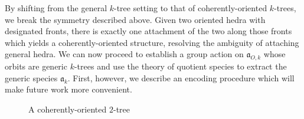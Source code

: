 \documentclass[sectionflow,singlespace,twoside]{brandiss} %
\numberwithin{section}{chapter}
\numberwithin{figure}{chapter}
\begin{document}
By shifting from the general $k$-tree setting to that of coherently-oriented $k$-trees, we break the symmetry described above.
Given two oriented hedra with designated fronts, there is exactly one attachment of the two along those fronts which yields a coherently-oriented structure, resolving the ambiguity of attaching general hedra.
We can now proceed to establish a group action on $\mathfrak{a}_{O, k}$ whose orbits are generic $k$-trees and use the theory of quotient species to extract the generic species $\mathfrak{a}_{k}$.
First, however, we describe an encoding procedure which will make future work more convenient.

\begin{figure}[htb]
  \centering
  \caption{A coherently-oriented $2$-tree}
  \label{fig:exco2tree}
\end{figure}
\end{document}
